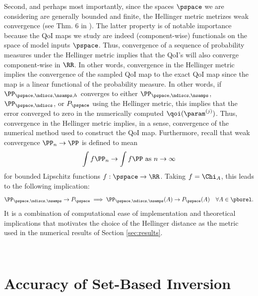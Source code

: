 Second, and perhaps most importantly, since the spaces $\pspace$ we are considering are generally bounded and finite, the Hellinger metric metrizes weak convergence (see Thm. 6 in \cite{GS02}).
The latter property is of notable importance because the QoI maps we study are indeed (component-wise) functionals on the space of model inputs $\pspace$.
Thus, convergence of a sequence of probability measures under the Hellinger metric implies that the QoI's will also converge component-wise in $\RR$.
In other words, convergence in the Hellinger metric implies the convergence of the sampled QoI map to the exact QoI map since the map is a linear functional of the probability measure.
In other words, if $\PP_{\pspace,\ndiscs,\nsamps,h}$ converges to either $\PP_{\pspace,\ndiscs,\nsamps}$, $\PP_{\pspace,\ndiscs}$, or $P_\pspace$ using the Hellinger metric, this implies that the error converged to zero in the numerically computed $\qoi(\param^{(j)})$.
Thus, convergence in the Hellinger metric implies, in a sense, convergence of the numerical method used to construct the QoI map.
Furthermore, recall that weak convergence $\PP_n \to \PP$ is defined to mean
\[
\int f \PP_n \to \int f \PP \text{ as } n \to \infty
\]
for bounded Lipschitz functions $f:\pspace\to\RR$.
Taking $f = \Chi_A$, this leads to the following implication:
\[
\PP_{\pspace, \ndiscs, \nsamps} \to P_\pspace \implies \PP_{\pspace, \ndiscs, \nsamps} (A) \to P_\pspace (A) \quad \forall{A\in\pborel}.
\]
It is a combination of computational ease of implementation and theoretical implications that motivates the choice of the Hellinger distance as the metric used in the numerical results of Section \ref{sec:results}.



\
\section{Accuracy of Set-Based Inversion}\label{sec:ch03-set}




